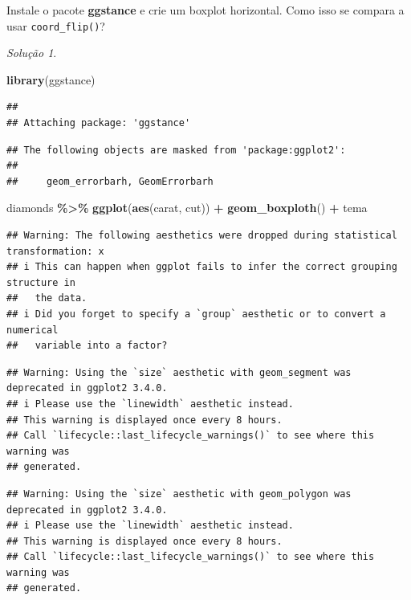 \documentclass[
]{latex/krantz}
\newenvironment{Shaded}{\begin{snugshade}}{\end{snugshade}}
\newcommand{\FunctionTok}[1]{\textcolor[rgb]{0.13,0.29,0.53}{\textbf{#1}}}
\newcommand{\NormalTok}[1]{#1}
\newcommand{\SpecialCharTok}[1]{\textcolor[rgb]{0.81,0.36,0.00}{\textbf{#1}}}
\theoremstyle{definition}
\theoremstyle{definition}
\theoremstyle{definition}
\theoremstyle{definition}
\theoremstyle{remark}
\newtheorem*{solution}{Solução}
\begin{document}
Instale o pacote \textbf{ggstance} e crie um boxplot horizontal. Como isso se compara a usar \texttt{coord\_flip()}?

\begin{solution}
\leavevmode

\begin{Shaded}
\begin{Highlighting}[]
\FunctionTok{library}\NormalTok{(ggstance)}
\end{Highlighting}
\end{Shaded}

\begin{verbatim}
## 
## Attaching package: 'ggstance'
\end{verbatim}

\begin{verbatim}
## The following objects are masked from 'package:ggplot2':
## 
##     geom_errorbarh, GeomErrorbarh
\end{verbatim}

\begin{Shaded}
\begin{Highlighting}[]
\NormalTok{diamonds }\SpecialCharTok{\%\textgreater{}\%}
    \FunctionTok{ggplot}\NormalTok{(}\FunctionTok{aes}\NormalTok{(carat, cut)) }\SpecialCharTok{+}
        \FunctionTok{geom\_boxploth}\NormalTok{() }\SpecialCharTok{+}
\NormalTok{        tema}
\end{Highlighting}
\end{Shaded}

\begin{verbatim}
## Warning: The following aesthetics were dropped during statistical transformation: x
## i This can happen when ggplot fails to infer the correct grouping structure in
##   the data.
## i Did you forget to specify a `group` aesthetic or to convert a numerical
##   variable into a factor?
\end{verbatim}

\begin{verbatim}
## Warning: Using the `size` aesthetic with geom_segment was deprecated in ggplot2 3.4.0.
## i Please use the `linewidth` aesthetic instead.
## This warning is displayed once every 8 hours.
## Call `lifecycle::last_lifecycle_warnings()` to see where this warning was
## generated.
\end{verbatim}

\begin{verbatim}
## Warning: Using the `size` aesthetic with geom_polygon was deprecated in ggplot2 3.4.0.
## i Please use the `linewidth` aesthetic instead.
## This warning is displayed once every 8 hours.
## Call `lifecycle::last_lifecycle_warnings()` to see where this warning was
## generated.
\end{verbatim}


\end{solution}
\end{document}
